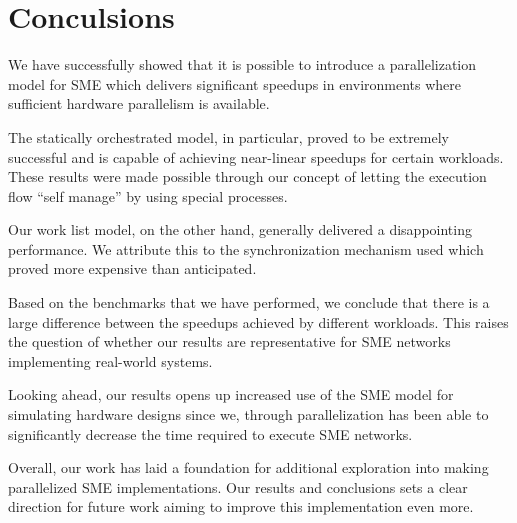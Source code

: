\chapter{Conculsions}

We have successfully showed that it is possible to introduce a
parallelization model for SME which delivers significant speedups in
environments where sufficient hardware parallelism is available.

\noindent
The statically orchestrated model, in particular, proved to be extremely
successful and is capable of achieving near-linear speedups for certain
workloads. These results were made possible through our concept of
letting the execution flow "`self manage"' by using special processes.

\noindent
Our work list model, on the other hand, generally delivered a
disappointing performance. We attribute this to the synchronization
mechanism used which proved more expensive than anticipated.

\noindent
Based on the benchmarks that we have performed, we conclude that there
is a large difference between the speedups achieved by different
workloads. This raises the question of whether our results are
representative for SME networks implementing real-world systems.

\noindent
Looking ahead, our results opens up increased use of the SME model for
simulating hardware designs since we, through parallelization has been
able to significantly decrease the time required to execute SME
networks.

\noindent
Overall, our work has laid a foundation for additional exploration
into making parallelized SME implementations. Our results and
conclusions sets a clear direction for future work aiming to improve
this implementation even more.

